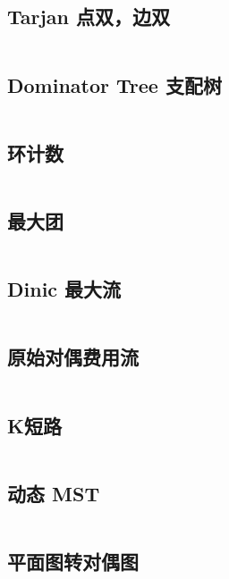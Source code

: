 				\subsection{Tarjan 点双，边双}
					\inputminted{cpp}{sections/GraphTheory/assets/graph/Tarjan.cpp}
				\subsection{Dominator Tree 支配树}
					\inputminted{cpp}{sections/GraphTheory/assets/graph/支配树.cpp}
				\subsection{环计数}
					\inputminted{cpp}{sections/GraphTheory/assets/graph/环计数.cpp}
				\subsection{最大团}
					\inputminted{cpp}{sections/GraphTheory/assets/graph/MaximumClique.cpp}
				\subsection{Dinic 最大流}
					
					\inputminted[highlightlines={8,30}]{cpp}{sections/GraphTheory/assets/graph/Dinic.cpp}
				\subsection{原始对偶费用流}
					\inputminted[highlightlines={50}]{cpp}{sections/GraphTheory/assets/graph/原始对偶费用流.cpp}
				\subsection{K短路}
					\inputminted{cpp}{sections/GraphTheory/assets/graph/K短路.cpp}
				\subsection{动态 MST}
					\inputminted{cpp}{sections/GraphTheory/assets/graph/DynamicMST.cpp}
				\subsection{平面图转对偶图}
					\inputminted{cpp}{sections/GraphTheory/assets/graph/平面图转对偶图.cpp}
